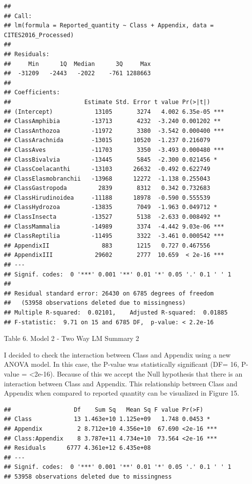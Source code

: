 \documentclass[
  12pt,
]{article}
\begin{document}
\begin{verbatim}
## 
## Call:
## lm(formula = Reported_quantity ~ Class + Appendix, data = CITES2016_Processed)
## 
## Residuals:
##     Min      1Q  Median      3Q     Max 
##  -31209   -2443   -2022    -761 1288663 
## 
## Coefficients:
##                     Estimate Std. Error t value Pr(>|t|)    
## (Intercept)            13105       3274   4.002 6.35e-05 ***
## ClassAmphibia         -13713       4232  -3.240 0.001202 ** 
## ClassAnthozoa         -11972       3380  -3.542 0.000400 ***
## ClassArachnida        -13015      10520  -1.237 0.216079    
## ClassAves             -11703       3350  -3.493 0.000480 ***
## ClassBivalvia         -13445       5845  -2.300 0.021456 *  
## ClassCoelacanthi      -13103      26632  -0.492 0.622749    
## ClassElasmobranchii   -13968      12272  -1.138 0.255043    
## ClassGastropoda         2839       8312   0.342 0.732683    
## ClassHirudinoidea     -11188      18978  -0.590 0.555539    
## ClassHydrozoa         -13835       7049  -1.963 0.049712 *  
## ClassInsecta          -13527       5138  -2.633 0.008492 ** 
## ClassMammalia         -14989       3374  -4.442 9.03e-06 ***
## ClassReptilia         -11495       3322  -3.461 0.000542 ***
## AppendixII               883       1215   0.727 0.467556    
## AppendixIII            29602       2777  10.659  < 2e-16 ***
## ---
## Signif. codes:  0 '***' 0.001 '**' 0.01 '*' 0.05 '.' 0.1 ' ' 1
## 
## Residual standard error: 26430 on 6785 degrees of freedom
##   (53958 observations deleted due to missingness)
## Multiple R-squared:  0.02101,    Adjusted R-squared:  0.01885 
## F-statistic:  9.71 on 15 and 6785 DF,  p-value: < 2.2e-16
\end{verbatim}

Table 6. Model 2 - Two Way LM Summary 2

I decided to check the interaction between Class and Appendix using a
new ANOVA model. In this case, the P-value was statistically significant
(DF= 16, P-value = \textless2e-16). Because of this we accept the Null
hypothesis that there is an interaction between Class and Appendix. This
relationship between Class and Appendix when compared to reported
quantity can be visualized in Figure 15.

\begin{verbatim}
##                  Df    Sum Sq   Mean Sq F value Pr(>F)    
## Class            13 1.463e+10 1.125e+09   1.748 0.0453 *  
## Appendix          2 8.712e+10 4.356e+10  67.690 <2e-16 ***
## Class:Appendix    8 3.787e+11 4.734e+10  73.564 <2e-16 ***
## Residuals      6777 4.361e+12 6.435e+08                   
## ---
## Signif. codes:  0 '***' 0.001 '**' 0.01 '*' 0.05 '.' 0.1 ' ' 1
## 53958 observations deleted due to missingness
\end{verbatim}
\end{document}
